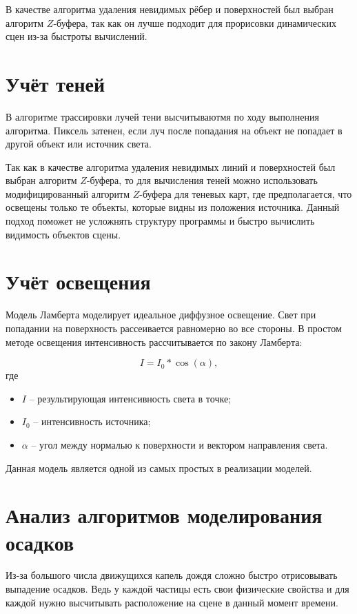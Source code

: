 В качестве алгоритма удаления невидимых рёбер и поверхностей был выбран алгоритм $Z$-буфера, так как он лучше подходит для прорисовки динамических сцен из-за быстроты вычислений.

\section{Учёт теней}

В алгоритме трассировки лучей тени высчитываютмя по ходу выполнения алгоритма. Пиксель затенен, если луч после попадания на объект не попадает в другой объект или источник света. 

Так как в качестве алгоритма удаления невидимых линий и поверхностей был выбран алгоритм $Z$-буфера, то для вычисления теней можно использовать модифицированный алгоритм $Z$-буфера для теневых карт, где предполагается, что освещены только те объекты, которые видны из положения источника. Данный подход поможет не усложнять структуру программы и быстро вычислить видимость объектов сцены.

\section{Учёт освещения}

Модель Ламберта моделирует идеальное диффузное освещение. Свет при попадании на поверхность рассеивается равномерно во все стороны. 
В простом методе освещения интенсивность рассчитывается по закону
Ламберта:

\begin{equation}
	I = I_0 * \cos(\alpha),
\end{equation}
где
\begin{itemize}
    \item $I$ -- результирующая интенсивность света в точке;
    \item $I_0$ -- интенсивность источника;
    \item $\alpha$ -- угол между нормалью к поверхности и вектором направления света.
\end{itemize}

Данная модель является одной из самых простых в реализации моделей.

\section{Анализ алгоритмов моделирования \\осадков}

Из-за большого числа движущихся капель дождя сложно быстро отрисовывать выпадение осадков. Ведь у каждой частицы есть свои физические свойства и для каждой нужно высчитывать расположение на сцене в данный момент времени.


